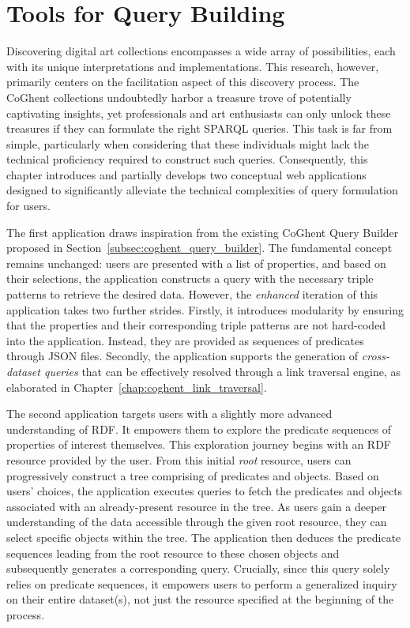 \chapter{Tools for Query Building}
\label{chap:tools_query_building}

Discovering digital art collections encompasses a wide array of possibilities, each with its unique interpretations and implementations. This research, however, primarily centers on the facilitation aspect of this discovery process. The CoGhent collections undoubtedly harbor a treasure trove of potentially captivating insights, yet professionals and art enthusiasts can only unlock these treasures if they can formulate the right SPARQL queries. This task is far from simple, particularly when considering that these individuals might lack the technical proficiency required to construct such queries. Consequently, this chapter introduces and partially develops two conceptual web applications designed to significantly alleviate the technical complexities of query formulation for users.

The first application draws inspiration from the existing CoGhent Query Builder proposed in Section~\ref{subsec:coghent_query_builder}. The fundamental concept remains unchanged: users are presented with a list of properties, and based on their selections, the application constructs a query with the necessary triple patterns to retrieve the desired data. However, the \textit{enhanced} iteration of this application takes two further strides. Firstly, it introduces modularity by ensuring that the properties and their corresponding triple patterns are not hard-coded into the application. Instead, they are provided as sequences of predicates through JSON files. Secondly, the application supports the generation of \textit{cross-dataset queries} that can be effectively resolved through a link traversal engine, as elaborated in Chapter~\ref{chap:coghent_link_traversal}.

The second application targets users with a slightly more advanced understanding of RDF. It empowers them to explore the predicate sequences of properties of interest themselves. This exploration journey begins with an RDF resource provided by the user. From this initial \textit{root} resource, users can progressively construct a tree comprising of predicates and objects. Based on users' choices, the application executes queries to fetch the predicates and objects associated with an already-present resource in the tree. As users gain a deeper understanding of the data accessible through the given root resource, they can select specific objects within the tree. The application then deduces the predicate sequences leading from the root resource to these chosen objects and subsequently generates a corresponding query. Crucially, since this query solely relies on predicate sequences, it empowers users to perform a generalized inquiry on their entire dataset(s), not just the resource specified at the beginning of the process.

